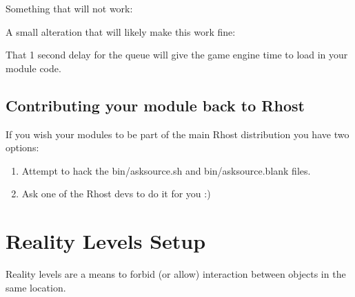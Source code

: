 \documentclass[letterpaper,10pt,english]{sphinxmanual}
\begin{document}
\sphinxAtStartPar
Something that will not work:

\begin{sphinxVerbatim}[commandchars=\\\{\}]
  
\end{sphinxVerbatim}

\sphinxAtStartPar
A small alteration that will likely make this work fine:

\begin{sphinxVerbatim}[commandchars=\\\{\}]
   
\end{sphinxVerbatim}

\sphinxAtStartPar
That 1 second delay for the queue will give the game engine time to load in your module code.


\subsection{Contributing your module back to Rhost}
\label{\detokenize{advanced:contributing-your-module-back-to-rhost}}
\sphinxAtStartPar
If you wish your modules to be part of the main Rhost distribution you have two options:
\begin{enumerate}
%
\item {} 
\sphinxAtStartPar
Attempt to hack the bin/asksource.sh and bin/asksource.blank files.

\item {} 
\sphinxAtStartPar
Ask one of the Rhost devs to do it for you :)

\end{enumerate}


\section{Reality Levels Setup}
\label{\detokenize{advanced:reality-levels-setup}}
\sphinxAtStartPar
Reality levels are a means to forbid (or allow) interaction between objects
in the same location.
\end{document}
